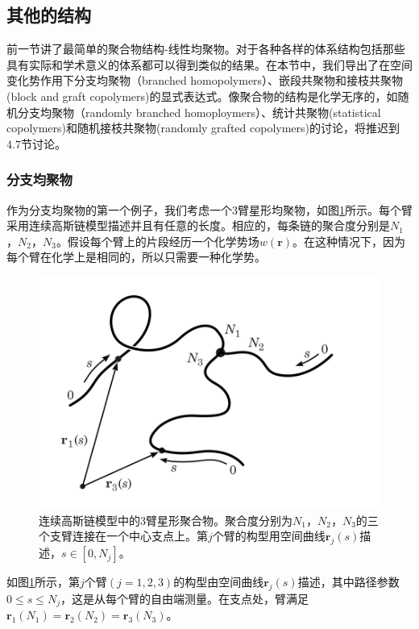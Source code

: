 \subsection{其他的结构}
\author{gx}

前一节讲了最简单的聚合物结构-线性均聚物。对于各种各样的体系结构包括那些具有实际和学术意义的体系都可以得到类似的结果。在本节中，我们导出了在空间变化势作用下分支均聚物（branched homopolymers）、嵌段共聚物和接枝共聚物(block and graft copolymers)的显式表达式。像聚合物的结构是化学无序的，如随机分支均聚物（randomly branched homoploymers）、统计共聚物(statistical copolymers)和随机接枝共聚物(randomly grafted copolymers)的讨论，将推迟到$4.7$节讨论。
\subsubsection{分支均聚物}
作为分支均聚物的第一个例子，我们考虑一个$3$臂星形均聚物，如图\ref{三臂星形均聚物}所示。每个臂采用连续高斯链模型描述并且有任意的长度。相应的，每条链的聚合度分别是$N_1$，$N_2$，$N_3$。假设每个臂上的片段经历一个化学势场$w (\mathbf{r})$。在这种情况下，因为每个臂在化学上是相同的，所以只需要一种化学势。
\begin{figure}[H]
\centering
\includegraphics[scale=0.7]{./figures/34.png}
\caption{连续高斯链模型中的$3$臂星形聚合物。聚合度分别为$N_1$，$N_2$，$N_3$的三个支臂连接在一个中心支点上。第$j$个臂的构型用空间曲线$\mathbf{r}_j(s)$描述，$s\in [0,N_j]$。}
\label{三臂星形均聚物}
\end{figure}

如图\ref{三臂星形均聚物}所示，第$j$个臂$(j=1,2,3)$的构型由空间曲线$\mathbf{r}_j(s)$描述，其中路径参数$0\leq s\leq N_j$，这是从每个臂的自由端测量。在支点处，臂满足$\mathbf{r}_1(N_1)=\mathbf{r}_2(N_2)=\mathbf{r}_3(N_3)$。

